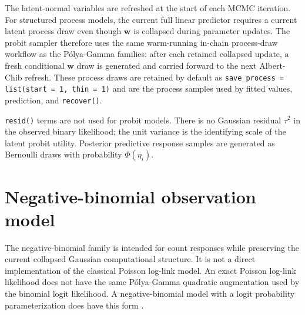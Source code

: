 \documentclass[11pt]{article}
\newcommand{\bw}{\bm{w}}
\begin{document}
The latent-normal variables are refreshed at the start of each MCMC iteration. For structured process models, the current full linear predictor requires a current latent process draw even though $\bw$ is collapsed during parameter updates. The probit sampler therefore uses the same warm-running in-chain process-draw workflow as the P{\'o}lya-Gamma families: after each retained collapsed update, a fresh conditional $\bw$ draw is generated and carried forward to the next Albert-Chib refresh. These process draws are retained by default as \texttt{save\_process = list(start = 1, thin = 1)} and are the process samples used by fitted values, prediction, and \texttt{recover()}.

\texttt{resid()} terms are not used for probit models. There is no Gaussian residual $\tau^2$ in the observed binary likelihood; the unit variance is the identifying scale of the latent probit utility. Posterior predictive response samples are generated as Bernoulli draws with probability $\Phi(\eta_i)$.

\section{Negative-binomial observation model}\label{sec:negative-binomial}

The negative-binomial family is intended for count responses while preserving the current collapsed Gaussian computational structure. It is not a direct implementation of the classical Poisson log-link model. An exact Poisson log-link likelihood does not have the same P{\'o}lya-Gamma quadratic augmentation used by the binomial logit likelihood. A negative-binomial model with a logit probability parameterization does have this form \citep{Polson2013,WindleDynamic2013,Zhou2012}.
\end{document}
